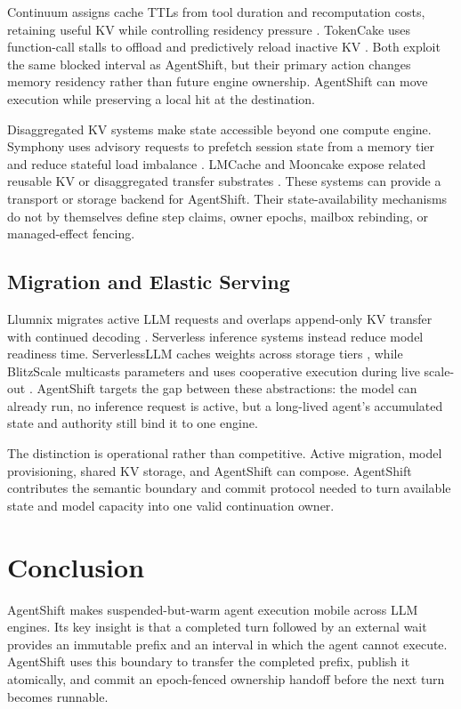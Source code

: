 Continuum assigns cache TTLs from tool duration and recomputation costs, retaining useful KV while controlling residency pressure \cite{continuum}. TokenCake uses function-call stalls to offload and predictively reload inactive KV \cite{tokencake}. Both exploit the same blocked interval as AgentShift, but their primary action changes memory residency rather than future engine ownership. AgentShift can move execution while preserving a local hit at the destination.

Disaggregated KV systems make state accessible beyond one compute engine. Symphony uses advisory requests to prefetch session state from a memory tier and reduce stateful load imbalance \cite{symphony}. LMCache and Mooncake expose related reusable KV or disaggregated transfer substrates \cite{lmcache, mooncake}. These systems can provide a transport or storage backend for AgentShift. Their state-availability mechanisms do not by themselves define step claims, owner epochs, mailbox rebinding, or managed-effect fencing.

\subsection{Migration and Elastic Serving}\label{migration-and-elastic-serving}

Llumnix migrates active LLM requests and overlaps append-only KV transfer with continued decoding \cite{llumnix}. Serverless inference systems instead reduce model readiness time. ServerlessLLM caches weights across storage tiers \cite{serverlessllm}, while BlitzScale multicasts parameters and uses cooperative execution during live scale-out \cite{blitzscale}. AgentShift targets the gap between these abstractions: the model can already run, no inference request is active, but a long-lived agent's accumulated state and authority still bind it to one engine.

The distinction is operational rather than competitive. Active migration, model provisioning, shared KV storage, and AgentShift can compose. AgentShift contributes the semantic boundary and commit protocol needed to turn available state and model capacity into one valid continuation owner.

\section{Conclusion}\label{conclusion}

AgentShift makes suspended-but-warm agent execution mobile across LLM engines. Its key insight is that a completed turn followed by an external wait provides an immutable prefix and an interval in which the agent cannot execute. AgentShift uses this boundary to transfer the completed prefix, publish it atomically, and commit an epoch-fenced ownership handoff before the next turn becomes runnable.

